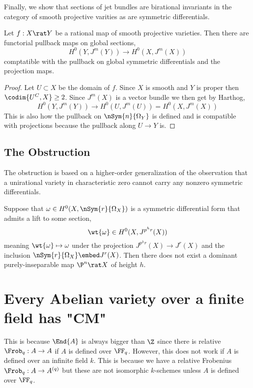\documentclass[12pt]{article}
\begin{document}
Finally, we show that sections of jet bundles are birational invariants in the category of smooth projective varities as are symmetric differentials.

\begin{prop}
Let $f : X \rat Y$ be a rational map of smooth projective varieties. Then there are functorial pullback maps on global sections,
\[ H^0(Y, J^m(Y)) \to H^0(X, J^m(X)) \]
comptatible with the pullback on global symmetric differentials and the projection maps.
\end{prop}

\begin{proof}
Let $U \subset X$ be the domain of $f$. Since $X$ is smooth and $Y$ is proper then $\codim{U^C,X} \ge 2$. Since $J^m(X)$ is a vector bundle we then get by Harthog,
\[ H^0(Y, J^m(Y)) \to H^0(U, J^m(U)) = H^0(X, J^m(X)) \]
This is also how the pullback on $\nSym{n}{\Omega_Y}$ is defined and is compatible with projections because the pullback along $U \to Y$ is. 
\end{proof}


\subsection{The Obstruction}

The obstruction is based on a higher-order generalization of the observation that a unirational variety in characteristic zero cannot carry any nonzero symmetric differentials.

\begin{thm}
Suppose that $\omega \in H^0(X, \nSym{r}{\Omega_X})$ is a symmetric differential form that admits a lift to some section,
\[ \wt{\omega} \in H^0(X, J^{p^h r}(X)) \]
meaning $\wt{\omega} \mapsto \omega$ under the projection $J^{p^h r}(X) \to J^r(X)$ and the inclusion $\nSym{r}{\Omega_X} \embed J^r(X)$. Then there does not exist a dominant purely-inseparable map $\P^n \rat X$ of height $h$.
\end{thm} 


\section{Every Abelian variety over a finite field has "CM"}

This is because $\End{A}$ is always bigger than $\Z$ since there is relative $\Frob_q : A \to A$ if $A$ is defined over $\FF_q$. However, this does not work if $A$ is defined over an infinite field $k$. This is because we have a relative Frobenius $\Frob_q : A \to A^{(q)}$ but these are not isomorphic $k$-schemes unless $A$ is defined over $\FF_q$.
\end{document}
